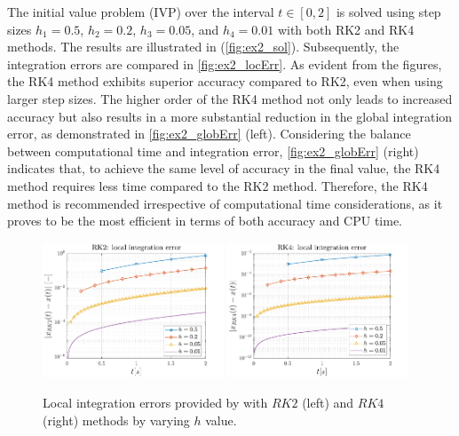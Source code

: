 \documentclass[11pt,a4paper,oneside]{article}
\begin{document}
The initial value problem (IVP) over the interval $t\in[0,2]$ is solved using step sizes $h_1 = 0.5$, $h_2 = 0.2$, $h_3 = 0.05$, and $h_4 = 0.01$ with both RK2 and RK4 methods. The results are illustrated in (\autoref{fig:ex2_sol}). Subsequently, the integration errors are compared in \autoref{fig:ex2_locErr}. As evident from the figures, the RK4 method exhibits superior accuracy compared to RK2, even when using larger step sizes.
The higher order of the RK4 method not only leads to increased accuracy but also results in a more substantial reduction in the global integration error, as demonstrated in \autoref{fig:ex2_globErr} (left).
Considering the balance between computational time and integration error, \autoref{fig:ex2_globErr} (right) indicates that, to achieve the same level of accuracy in the final value, the RK4 method requires less time compared to the RK2 method. Therefore, the RK4 method is recommended irrespective of computational time considerations, as it proves to be the most efficient in terms of both accuracy and CPU time.

\begin{figure}[ht]
    \centering
    \includegraphics[width = 0.48\textwidth]{gfx/ex2_3.pdf}
    \includegraphics[width = 0.48\textwidth]{gfx/ex2_4.pdf}
    \caption{Local integration errors provided by with $RK2$ (left) and $RK4$ (right) methods by varying $h$ value.}
    \label{fig:ex2_locErr}
\end{figure}
\end{document}
